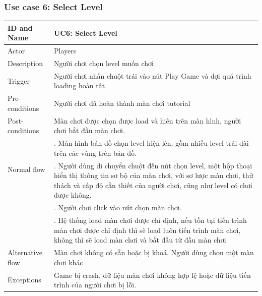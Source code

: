 \subsubsection{Use case 6: Select Level}
\begin{center}
	\begin{tabular}{|l|p{12cm}|}
		\hline
		ID and Name & UC6: Select Level \\
		\hline
		Actor  & Players \\
		\hline
		Description  & Người chơi chọn level muốn chơi\\
		\hline
		Trigger  & Người chơi nhấn chuột trái vào nút Play Game và đợi quá trình loading hoàn tất\\
		\hline
		Pre-conditions & Người chơi đã hoàn thành màn chơi tutorial\\
		\hline
		Post-conditions  & Màn chơi được chọn được load và hiên trên màn hình, người chơi bắt đầu màn chơi.\\
		\hline
		\multirow{2}{*}{Normal flow}      &\qquad 1. Màn hình bản đồ chọn level hiện lên, gồm nhiều level trải dài trên các vùng trên bản đồ.\\
		&\qquad 2. Người dùng di chuyển chuột đến nút chọn level, một hộp thoại hiển thị thông tin sơ bộ của màn chơi, với sơ lược màn chơi, thử thách và cấp độ cần thiết của người chơi, cũng như level có chơi được không.\\
		&\qquad 3. Người chơi click vào nút chọn màn chơi.\\
		&\qquad 4. Hệ thống load màn chơi được chỉ định, nếu tồn tại tiến trình màn chơi được chỉ định thì sẽ load luôn tiến trình màn chơi, không thì sẽ load màn chơi và bắt đầu từ đầu màn chơi\\
		\hline
		Alternative flow  & Màn chơi không có sẵn hoặc bị khoá. Người dùng chọn một màn chơi khác\\
		\hline
		Exceptions  & Game bị crash, dữ liệu màn chơi không hợp lệ hoặc dữ liệu tiến trình của người chơi bị lỗi.\\
		\hline
	\end{tabular}
\end{center}
